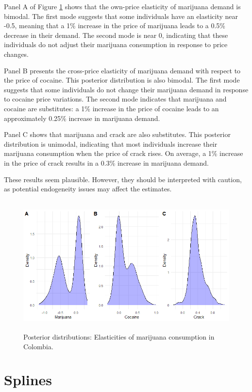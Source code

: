 Panel A of Figure \ref{figElastDrugs} shows that the own-price elasticity of marijuana demand is bimodal. The first mode suggests that some individuals have an elasticity near -0.5, meaning that a 1\% increase in the price of marijuana leads to a 0.5\% decrease in their demand. The second mode is near 0, indicating that these individuals do not adjust their marijuana consumption in response to price changes. 

Panel B presents the cross-price elasticity of marijuana demand with respect to the price of cocaine. This posterior distribution is also bimodal. The first mode suggests that some individuals do not change their marijuana demand in response to cocaine price variations. The second mode indicates that marijuana and cocaine are substitutes: a 1\% increase in the price of cocaine leads to an approximately 0.25\% increase in marijuana demand.

Panel C shows that marijuana and crack are also substitutes. This posterior distribution is unimodal, indicating that most individuals increase their marijuana consumption when the price of crack rises. On average, a 1\% increase in the price of crack results in a 0.3\% increase in marijuana demand.

These results seem plausible. However, they should be interpreted with caution, as potential endogeneity issues may affect the estimates.
 
\begin{figure}[!h]
	\includegraphics[width=340pt, height=200pt]{Chapters/chapter11/figures/ElastDrugs.png}
	\caption[List of figure caption goes here]{Posterior distributions: Elasticities of marijuana consumption in Colombia.}\label{figElastDrugs}
\end{figure}



\section{Splines}\label{sec11_2}

